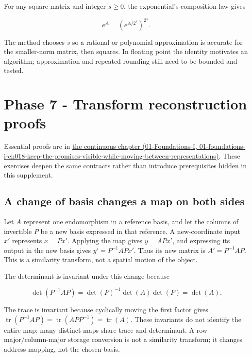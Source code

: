 For any square matrix and integer \(s\ge0\), the exponential's composition law gives

\[
e^A=\left(e^{A/2^s}\right)^{2^s}.
\]

The method chooses \(s\) so a rational or polynomial approximation is accurate for the smaller-norm matrix, then squares. In floating point the identity motivates an algorithm; approximation and repeated rounding still need to be bounded and tested.

\section{Phase 7 - Transform reconstruction proofs}\label{02-foundations-ii-ch039-phase-7---transform-reconstruction-proofs}

Essential proofs are in \href{../01-Foundations-I/main.pdf\#nameddest=01-foundations-i-ch018-keep-the-promises-visible-while-moving-between-representations}{the continuous chapter (01-Foundations-I, 01-foundations-i-ch018-keep-the-promises-visible-while-moving-between-representations)}. These exercises deepen the same contracts rather than introduce prerequisites hidden in this supplement.

\subsection{A change of basis changes a map on both sides}\label{02-foundations-ii-ch039-a-change-of-basis-changes-a-map-on-both-sides}

Let \(A\) represent one endomorphism in a reference basis, and let the columns of invertible \(P\) be a new basis expressed in that reference. A new-coordinate input \(x'\) represents \(x=Px'\). Applying the map gives \(y=APx'\), and expressing its output in the new basis gives \(y'=P^{-1}APx'\). Thus its new matrix is \(A'=P^{-1}AP\). This is a similarity transform, not a spatial motion of the object.

The determinant is invariant under this change because

\[
\det(P^{-1}AP)=\det(P)^{-1}\det(A)\det(P)=\det(A).
\]

The trace is invariant because cyclically moving the first factor gives \(\operatorname{tr}(P^{-1}AP)=\operatorname{tr}(APP^{-1})=\operatorname{tr}(A)\). These invariants do not identify the entire map: many distinct maps share trace and determinant. A row-major/column-major storage conversion is not a similarity transform; it changes address mapping, not the chosen basis.

